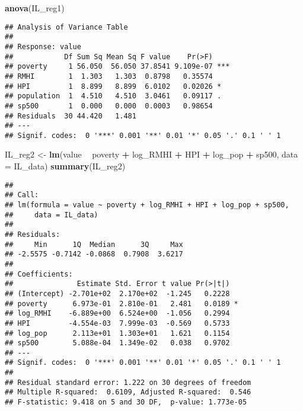 \documentclass[
]{article}
\newenvironment{Shaded}{\begin{snugshade}}{\end{snugshade}}
\newcommand{\DataTypeTok}[1]{\textcolor[rgb]{0.13,0.29,0.53}{#1}}
\newcommand{\KeywordTok}[1]{\textcolor[rgb]{0.13,0.29,0.53}{\textbf{#1}}}
\newcommand{\NormalTok}[1]{#1}
\newcommand{\OperatorTok}[1]{\textcolor[rgb]{0.81,0.36,0.00}{\textbf{#1}}}
\newcommand{\StringTok}[1]{\textcolor[rgb]{0.31,0.60,0.02}{#1}}
\begin{document}
\begin{Shaded}
\begin{Highlighting}[]
\KeywordTok{anova}\NormalTok{(IL_reg1)}
\end{Highlighting}
\end{Shaded}

\begin{verbatim}
## Analysis of Variance Table
## 
## Response: value
##            Df Sum Sq Mean Sq F value    Pr(>F)    
## poverty     1 56.050  56.050 37.8541 9.109e-07 ***
## RMHI        1  1.303   1.303  0.8798   0.35574    
## HPI         1  8.899   8.899  6.0102   0.02026 *  
## population  1  4.510   4.510  3.0461   0.09117 .  
## sp500       1  0.000   0.000  0.0003   0.98654    
## Residuals  30 44.420   1.481                      
## ---
## Signif. codes:  0 '***' 0.001 '**' 0.01 '*' 0.05 '.' 0.1 ' ' 1
\end{verbatim}

\begin{Shaded}
\begin{Highlighting}[]
\NormalTok{IL_reg2 <-}\StringTok{ }\KeywordTok{lm}\NormalTok{(value }\OperatorTok{~}\StringTok{ }\NormalTok{poverty }\OperatorTok{+}\StringTok{ }\NormalTok{log_RMHI }\OperatorTok{+}\StringTok{ }\NormalTok{HPI }\OperatorTok{+}\StringTok{ }\NormalTok{log_pop }\OperatorTok{+}\StringTok{ }\NormalTok{sp500, }\DataTypeTok{data =}\NormalTok{ IL_data)}
\KeywordTok{summary}\NormalTok{(IL_reg2)}
\end{Highlighting}
\end{Shaded}

\begin{verbatim}
## 
## Call:
## lm(formula = value ~ poverty + log_RMHI + HPI + log_pop + sp500, 
##     data = IL_data)
## 
## Residuals:
##     Min      1Q  Median      3Q     Max 
## -2.5575 -0.7142 -0.0868  0.7908  3.6217 
## 
## Coefficients:
##               Estimate Std. Error t value Pr(>|t|)  
## (Intercept) -2.701e+02  2.170e+02  -1.245   0.2228  
## poverty      6.973e-01  2.810e-01   2.481   0.0189 *
## log_RMHI    -6.889e+00  6.524e+00  -1.056   0.2994  
## HPI         -4.554e-03  7.999e-03  -0.569   0.5733  
## log_pop      2.113e+01  1.303e+01   1.621   0.1154  
## sp500        5.088e-04  1.349e-02   0.038   0.9702  
## ---
## Signif. codes:  0 '***' 0.001 '**' 0.01 '*' 0.05 '.' 0.1 ' ' 1
## 
## Residual standard error: 1.222 on 30 degrees of freedom
## Multiple R-squared:  0.6109, Adjusted R-squared:  0.546 
## F-statistic: 9.418 on 5 and 30 DF,  p-value: 1.773e-05
\end{verbatim}
\end{document}
